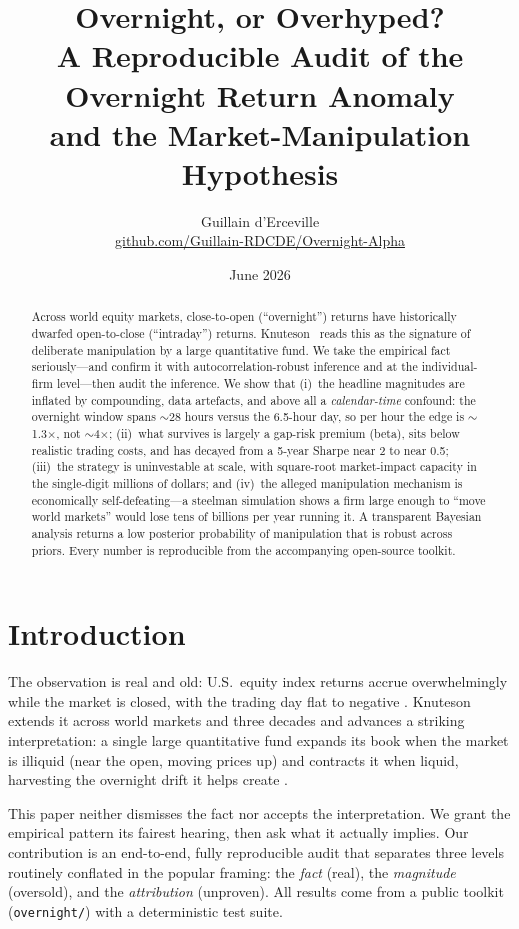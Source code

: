 \documentclass[11pt]{article}
\title{\textbf{Overnight, or Overhyped?}\\[2pt]
\large A Reproducible Audit of the Overnight Return Anomaly\\ and the Market-Manipulation Hypothesis}
\author{Guillain d'Erceville\\
\small\href{https://github.com/Guillain-RDCDE/Overnight-Alpha}{github.com/Guillain-RDCDE/Overnight-Alpha}}
\date{June 2026}
\begin{document}
\maketitle

\begin{abstract}
\noindent Across world equity markets, close-to-open (``overnight'') returns have
historically dwarfed open-to-close (``intraday'') returns. Knuteson~\cite{knuteson2019,knuteson2023}
reads this as the signature of deliberate manipulation by a large quantitative
fund. We take the empirical fact seriously---and confirm it with
autocorrelation-robust inference and at the individual-firm level---then audit
the inference. We show that (i)~the headline magnitudes are inflated by
compounding, data artefacts, and above all a \emph{calendar-time} confound: the
overnight window spans $\sim$28 hours versus the 6.5-hour day, so per hour the
edge is $\sim$1.3$\times$, not $\sim$4$\times$; (ii)~what survives is largely a
gap-risk premium (beta), sits below realistic trading costs, and has decayed from
a 5-year Sharpe near 2 to near 0.5; (iii)~the strategy is uninvestable at scale,
with square-root market-impact capacity in the single-digit millions of dollars;
and (iv)~the alleged manipulation mechanism is economically self-defeating---a
steelman simulation shows a firm large enough to ``move world markets'' would lose
tens of billions per year running it. A transparent Bayesian analysis returns a
low posterior probability of manipulation that is robust across priors. Every
number is reproducible from the accompanying open-source toolkit.
\end{abstract}

\section{Introduction}
The observation is real and old: U.S.\ equity index returns accrue
overwhelmingly while the market is closed, with the trading day flat to negative
\cite{cooper2008,berkman2012,lou2019}. Knuteson extends it across world markets
and three decades and advances a striking interpretation: a single large
quantitative fund expands its book when the market is illiquid (near the open,
moving prices up) and contracts it when liquid, harvesting the overnight drift it
helps create \cite{knuteson2019,knuteson2023}.

This paper neither dismisses the fact nor accepts the interpretation. We grant
the empirical pattern its fairest hearing, then ask what it actually implies. Our
contribution is an end-to-end, fully reproducible audit that separates three
levels routinely conflated in the popular framing: the \emph{fact} (real), the
\emph{magnitude} (oversold), and the \emph{attribution} (unproven). All results
come from a public toolkit (\texttt{overnight/}) with a deterministic test suite.
\end{document}
